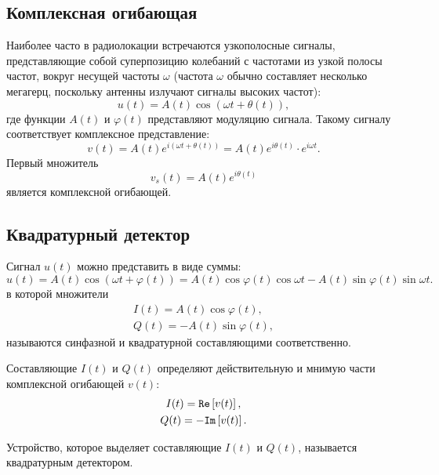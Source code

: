 \subsection{Комплексная огибающая}

Наиболее часто в радиолокации встречаются узкополосные сигналы, представляющие собой суперпозицию колебаний с частотами из узкой полосы частот, вокруг несущей
частоты $\omega$ (частота $\omega$ обычно составляет несколько мегагерц, поскольку антенны излучают сигналы высоких частот):
\[
    u(t) = A(t) \cos ( \omega t + \theta(t) ),
\]
где функции $A(t)$ и $\varphi(t)$ представляют модуляцию сигнала. Такому сигналу соответствует комплексное представление:
\[
    v(t)
    = A(t) e^{i ( \omega t + \theta(t) )}
    = A(t) e^{i \theta(t)} \cdot e^{i \omega t} .
\]
Первый множитель
\[
    v_s(t) = A(t) e^{i \theta(t)}
\]
является комплексной огибающей.

\subsection{Квадратурный детектор}

Сигнал $u(t)$ можно представить в виде суммы:
\[
    u(t)
    = A(t) \cos ( \omega t + \varphi(t) )
    = A(t) \cos \varphi(t) \cos \omega t - A(t) \sin \varphi(t) \sin \omega t .
\]
в которой множители
\begin{gather*}
    I(t) = A(t) \cos \varphi(t) , \\
    Q(t) = - A(t) \sin \varphi(t) ,
\end{gather*}
называются синфазной и квадратурной составляющими соответственно.

Составляющие $I(t)$ и $Q(t)$ определяют действительную и мнимую части комплексной огибающей $v(t)$:
\begin{gather*}
    I(t) = \mathtt{Re} \left [ v(t) \right ] , \\
    Q(t) = - \mathtt{Im} \left [ v(t) \right ] .
\end{gather*}

Устройство, которое выделяет составляющие $I(t)$ и $Q(t)$, называется квадратурным детектором.
